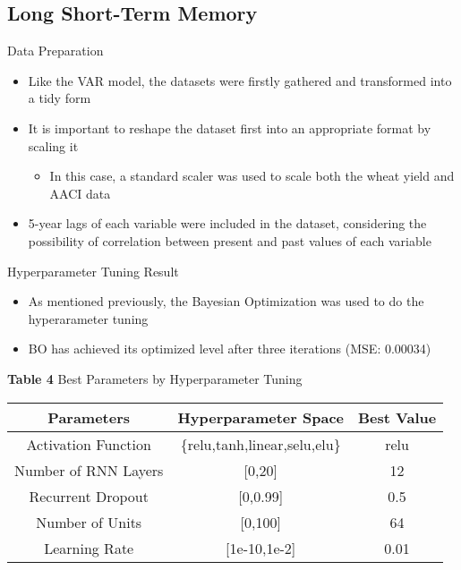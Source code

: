 \documentclass[aspectratio=169]{beamer}
\begin{document}
\subsection{Long Short-Term Memory}
\begin{frame}{Data Preparation}
\begin{itemize}
    \item Like the VAR model, the datasets were firstly gathered and transformed into a tidy form
    \item It is important to reshape the dataset first into an appropriate format by scaling it
    \begin{itemize}
        \item In this case, a standard scaler was used to scale both the wheat yield and AACI data
    \end{itemize}
    \item 5-year lags of each variable were included in the dataset, considering the possibility of correlation between present and past values of each variable
\end{itemize}
\end{frame}

\begin{frame}{Hyperparameter Tuning Result}
\begin{center}
    \begin{itemize}
        \item As mentioned previously, the Bayesian Optimization was used to do the hyperarameter tuning
        \item BO has achieved its optimized level after three iterations (MSE: 0.00034)
    \end{itemize}
    \vspace{0.5cm}
             \scriptsize{\textbf{Table 4} Best Parameters by Hyperparameter Tuning}\\
                \begin{tabular}{||c c c||} 
                \hline
                Parameters & Hyperparameter Space & Best Value \\ [0.5ex] 
                 \hline\hline
                 Activation Function & \{relu,tanh,linear,selu,elu\} & relu \\ 
                 \hline
                 Number of RNN Layers & [0,20] & 12 \\
                \hline
                 Recurrent Dropout & [0,0.99] & 0.5 \\
                \hline
                 Number of Units & [0,100] & 64 \\
                 \hline
                 Learning Rate & [1e-10,1e-2] & 0.01 \\ [1ex] 
                 \hline
                \end{tabular}       
\end{center}
\end{frame}
\end{document}
